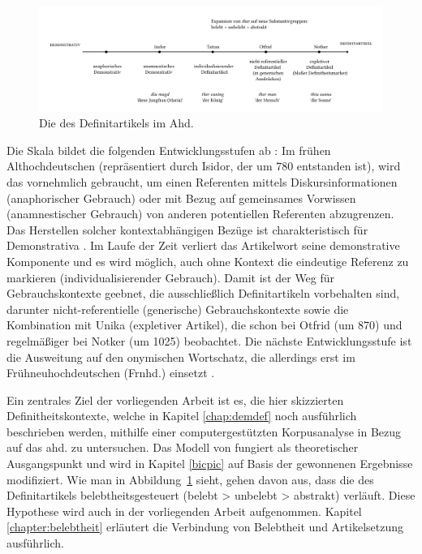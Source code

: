 \begin{figure}
\includegraphics[width=\textwidth]{images/schmuckszczep.pdf}
\caption {Die  des Definitartikels im Ahd. \parencite[102]{Schmuck2014}\label{abb:schmuckszczep}}
\end{figure}
 
Die Skala bildet die folgenden Entwicklungsstufen ab \parencite[vgl. auch][69--78]{Szczepaniak2011a}: Im frühen Althochdeutschen (repräsentiert durch Isidor, der um 780 entstanden ist), wird das  vornehmlich gebraucht, um einen Referenten mittels Diskursinformationen (anaphorischer Gebrauch)  oder mit Bezug auf gemeinsames Vorwissen (anamnestischer Gebrauch)   von anderen potentiellen Referenten abzugrenzen. Das Herstellen solcher kontextabhängigen Bezüge ist charakteristisch für Demonstrativa  \parencite[85]{Himmelmann1997}. Im Laufe der Zeit verliert das Artikelwort  seine demonstrative Komponente und es wird möglich, auch ohne Kontext die eindeutige Referenz zu markieren (individualisierender Gebrauch). Damit ist der Weg für Gebrauchskontexte geebnet, die ausschließlich Definitartikeln vorbehalten sind, darunter nicht-referentielle (generische) Gebrauchskontexte  sowie die Kombination mit Unika  (expletiver Artikel),  die \textcite{Oubouzar1989,Oubouzar1992} schon bei Otfrid (um 870) und regelmäßiger bei Notker (um 1025) beobachtet. Die nächste Entwicklungsstufe ist die Ausweitung auf den onymischen Wortschatz,  die allerdings erst im Frühneuhochdeutschen (Frnhd.) einsetzt \parencite[s. ausführlich][]{Schmuck2014}. 

Ein zentrales Ziel der vorliegenden Arbeit ist es, die hier skizzierten Definitheitskontexte,  welche in Kapitel \ref{chap:demdef} noch ausführlich beschrieben werden, mithilfe einer computergestützten Korpusanalyse in Bezug auf das ahd.  zu untersuchen. Das Modell von \textcite{Schmuck2014} fungiert als theoretischer Ausgangspunkt und wird in Kapitel \ref{bicpic} auf Basis der gewonnenen Ergebnisse modifiziert. Wie man in Abbildung~\ref{abb:schmuckszczep} sieht, gehen \textcite{Schmuck2014} davon aus, dass die  des Definitartikels belebtheitsgesteuert  (belebt > unbelebt > abstrakt) verläuft. Diese Hypothese wird auch in der vorliegenden Arbeit aufgenommen. Kapitel \ref{chapter:belebtheit} erläutert die Verbindung von Belebtheit  und Artikelsetzung ausführlich. 

